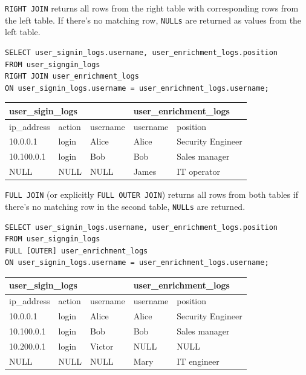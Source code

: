 \documentclass[9pt]{innovativeinnovation-cheatsheet}
\begin{document}
\begin{multicols}{3}
\texttt{RIGHT JOIN}  returns all rows from the right table with corresponding rows from the left table. If there's no matching row, \texttt{NULLs} are returned as values from the left table.
\begin{lstlisting}[style=code_style]
SELECT user_signin_logs.username, user_enrichment_logs.position
FROM user_signgin_logs
RIGHT JOIN user_enrichment_logs
ON user_signin_logs.username = user_enrichment_logs.username;
\end{lstlisting}
\scriptsize	
\begin{tabular}{| m{4em} | m{4em} | m{4em} || m{4em} | m{8em} | }
      \hline
      \multicolumn{3}{l}{user\_sigin\_logs} & \multicolumn{2}{l}{user\_enrichment\_logs} \\
      \hline
      \hline
      ip\_address & action & username & username  & position \\
      \hline
      10.0.0.1 & login & \cellcolor{blue!25} Alice & \cellcolor{blue!25} Alice & Security Engineer \\
      \hline
      10.100.0.1 & login & \cellcolor{blue!25} Bob & \cellcolor{blue!25} Bob & Sales manager \\
      \hline
      NULL & NULL & \cellcolor{blue!25} NULL & \cellcolor{blue!25} James & IT operator \\
      \hline
\end{tabular}

\texttt{FULL JOIN} (or explicitly \texttt{FULL OUTER JOIN}) returns all rows from both tables \- if there's no matching row in the second table, \texttt{NULLs} are returned.
\begin{lstlisting}[style=code_style]
SELECT user_signin_logs.username, user_enrichment_logs.position
FROM user_signgin_logs
FULL [OUTER] user_enrichment_logs
ON user_signin_logs.username = user_enrichment_logs.username;
\end{lstlisting}
\scriptsize	
\begin{tabular}{| m{4em} | m{4em} | m{4em} || m{4em} | m{8em} | }
      \hline
      \multicolumn{3}{l}{user\_sigin\_logs} & \multicolumn{2}{l}{user\_enrichment\_logs} \\
      \hline
      \hline
      ip\_address & action & username & username  & position \\
      \hline
      10.0.0.1 & login & \cellcolor{blue!25} Alice & \cellcolor{blue!25} Alice & Security Engineer \\
      \hline
      10.100.0.1 & login & \cellcolor{blue!25} Bob & \cellcolor{blue!25} Bob & Sales manager \\
      \hline
      10.200.0.1 & login & \cellcolor{blue!25} Victor & \cellcolor{blue!25} NULL & NULL \\
      \hline
      NULL & NULL & \cellcolor{blue!25} NULL & \cellcolor{blue!25} Mary & IT engineer \\
      \hline
\end{tabular}


\end{multicols}
\end{document}
